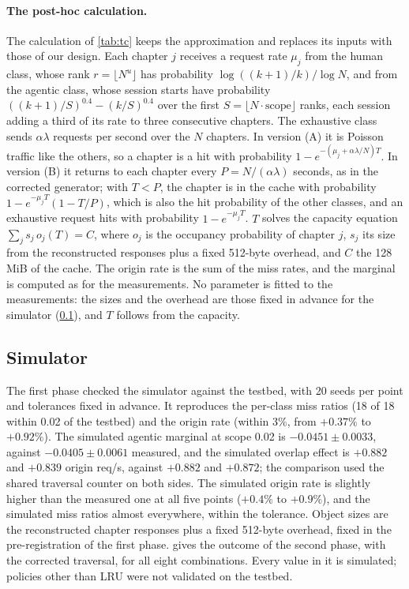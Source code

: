 \paragraph{The post-hoc calculation.}
The calculation of \cref{tab:tc} keeps the approximation and replaces its inputs with those
of our design.
Each chapter $j$ receives a request rate $\mu_j$ from the human class, whose rank
$r = \lfloor N^u \rfloor$ has probability $\log((k+1)/k)/\log N$, and from the agentic class,
whose session starts have probability $((k+1)/S)^{0.4} - (k/S)^{0.4}$ over the first
$S = \lfloor N \cdot \mathrm{scope} \rfloor$ ranks, each session adding a third of its rate to
three consecutive chapters.
The exhaustive class sends $\alpha\lambda$ requests per second over the $N$ chapters.
In version (A) it is Poisson traffic like the others, so a chapter is a hit with probability
$1 - e^{-(\mu_j + \alpha\lambda/N) T}$.
In version (B) it returns to each chapter every $P = N/(\alpha\lambda)$ seconds, as in the
corrected generator; with $T < P$, the chapter is in the cache with probability
$1 - e^{-\mu_j T}(1 - T/P)$, which is also the hit probability of the other classes, and an
exhaustive request hits with probability $1 - e^{-\mu_j T}$.
$T$ solves the capacity equation $\sum_j s_j\, o_j(T) = C$, where $o_j$ is the occupancy
probability of chapter $j$, $s_j$ its size from the reconstructed responses plus a fixed
512-byte overhead, and $C$ the 128\,MiB of the cache.
The origin rate is the sum of the miss rates, and the marginal is computed as for the
measurements.
No parameter is fitted to the measurements: the sizes and the overhead are those fixed in
advance for the simulator (\cref{app:sim}), and $T$ follows from the capacity.

\subsection{Simulator}\label{app:sim}
The first phase checked the simulator against the testbed, with 20 seeds per point and
tolerances fixed in advance.
It reproduces the per-class miss ratios (18 of 18 within 0.02 of the testbed) and the origin
rate (within 3\%, from $+0.37\%$ to $+0.92\%$).
The simulated agentic marginal at scope 0.02 is $-0.0451 \pm 0.0033$, against
$-0.0405 \pm 0.0061$ measured, and the simulated overlap effect is $+0.882$ and $+0.839$
origin req/s, against $+0.882$ and $+0.872$; the comparison used the shared traversal
counter on both sides.
The simulated origin rate is slightly higher than the measured one at all five points
($+0.4\%$ to $+0.9\%$), and the simulated miss ratios almost everywhere, within the
tolerance.
Object sizes are the reconstructed chapter responses plus a fixed 512-byte overhead, fixed
in the pre-registration of the first phase.
 gives the outcome of the second phase, with the corrected traversal, for all
eight combinations.
Every value in it is simulated; policies other than LRU were not validated on the testbed.

